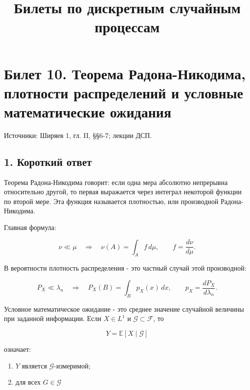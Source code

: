 \documentclass[
  11pt,
  a4paper,
]{article}
\title{Билеты по дискретным случайным процессам}
\author{}
\date{}
\providecommand{\tightlist}{%
  \setlength{\itemsep}{0pt}\setlength{\parskip}{0pt}}
\begin{document}
\maketitle

\section{Билет 10. Теорема Радона-Никодима, плотности распределений и
условные математические
ожидания}\label{ux431ux438ux43bux435ux442-10.-ux442ux435ux43eux440ux435ux43cux430-ux440ux430ux434ux43eux43dux430-ux43dux438ux43aux43eux434ux438ux43cux430-ux43fux43bux43eux442ux43dux43eux441ux442ux438-ux440ux430ux441ux43fux440ux435ux434ux435ux43bux435ux43dux438ux439-ux438-ux443ux441ux43bux43eux432ux43dux44bux435-ux43cux430ux442ux435ux43cux430ux442ux438ux447ux435ux441ux43aux438ux435-ux43eux436ux438ux434ux430ux43dux438ux44f}

Источники: Ширяев 1, гл. II, §§6-7; лекции ДСП.

\subsection{1. Короткий
ответ}\label{ux43aux43eux440ux43eux442ux43aux438ux439-ux43eux442ux432ux435ux442}

Теорема Радона-Никодима говорит: если одна мера абсолютно непрерывна
относительно другой, то первая выражается через интеграл некоторой
функции по второй мере. Эта функция называется плотностью, или
производной Радона-Никодима.

Главная формула:

\[
\nu\ll\mu
\quad\Longrightarrow\quad
\nu(A)=\int_A f\,d\mu,
\qquad
f=\frac{d\nu}{d\mu}.
\]

В вероятности плотность распределения - это частный случай этой
производной:

\[
P_X\ll\lambda_n
\quad\Longrightarrow\quad
P_X(B)=\int_B p_X(x)\,dx,
\qquad
p_X=\frac{dP_X}{d\lambda_n}.
\]

Условное математическое ожидание - это среднее значение случайной
величины при заданной информации. Если \(X\in L^1\) и
\(\mathcal G\subset\mathcal F\), то

\[
Y=\mathbb E[X\mid\mathcal G]
\]

означает:

\begin{enumerate}
\def\labelenumi{\arabic{enumi}.}
\tightlist
\item
  \(Y\) является \(\mathcal G\)-измеримой;
\item
  для всех \(G\in\mathcal G\)
\end{enumerate}
\end{document}
